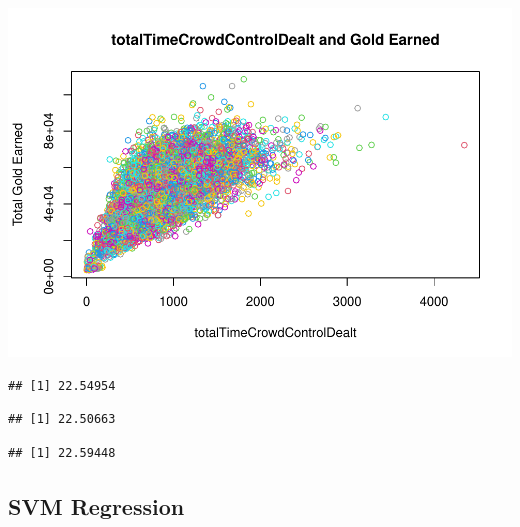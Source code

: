\documentclass[
]{article}
\newenvironment{Shaded}{\begin{snugshade}}{\end{snugshade}}
\newcommand{\FunctionTok}[1]{\textcolor[rgb]{0.00,0.00,0.00}{#1}}
\newcommand{\NormalTok}[1]{#1}
\newcommand{\SpecialCharTok}[1]{\textcolor[rgb]{0.00,0.00,0.00}{#1}}
\begin{document}
\includegraphics{Regression_files/figure-latex/unnamed-chunk-5-9.pdf}

\begin{Shaded}
\end{Shaded}

\begin{verbatim}
## [1] 22.54954
\end{verbatim}

\begin{Shaded}
\end{Shaded}

\begin{verbatim}
## [1] 22.50663
\end{verbatim}

\begin{Shaded}
\end{Shaded}

\begin{verbatim}
## [1] 22.59448
\end{verbatim}

\hypertarget{svm-regression}{%
\subsection{SVM Regression}\label{svm-regression}}
\end{document}
